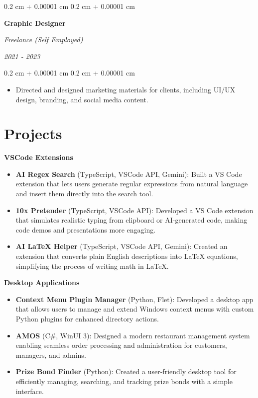 \documentclass[10pt, a4paper]{article}
\newenvironment{highlights}{
    \begin{itemize}[
        topsep=0.1 cm,
        parsep=0.1 cm,
        partopsep=0pt,
        itemsep=0pt,
        leftmargin=0.4 cm + 10pt
    ]
}{
    \end{itemize}
} %
\newenvironment{onecolentry}{
    \begin{adjustwidth}{
        0.2 cm + 0.00001 cm
    }{
        0.2 cm + 0.00001 cm
    }
}{
    \end{adjustwidth}
} %
\newenvironment{twocolentry}[2][]{
    \onecolentry
    \def\secondColumn{#2}
    \begin{paracol}{2}
}{
    \switchcolumn \raggedleft \secondColumn
    \end{paracol}
    \endonecolentry
} %
\newcommand{\createpointblock}[5]{%
    \begin{twocolentry}{%
        \textit{#2}

        \textit{#4}}
        \textbf{#1}

        \textit{#3}
    \end{twocolentry}

    \vspace{0.1 cm}
    \begin{onecolentry}
        \begin{highlights}
            #5
        \end{highlights}
    \end{onecolentry}
}
\let\hrefWithoutArrow\href
\renewcommand{\href}[2]{\hrefWithoutArrow{#1}{\ifthenelse{\equal{#2}{}}{ }{#2 }\raisebox{.15ex}{\footnotesize \faExternalLink*}}}
\begin{document}
    \vspace{0.2 cm}
    
    \createpointblock{Graphic Designer}{2021 - 2023}{Freelance (Self Employed)}{}
    {%
        \item Directed and designed marketing materials for clients, including UI/UX design, branding, and social media content.
    }
    
\section{Projects}

\textbf{VSCode Extensions}
\begin{highlights}
    \item \textbf{AI Regex Search} (TypeScript, VSCode API, Gemini): Built a VS Code extension that lets users generate regular expressions from natural language and insert them directly into the search tool. \href{https://github.com/abdxdev/ai-regex-search}{}
    \item \textbf{10x Pretender} (TypeScript, VSCode API): Developed a VS Code extension that simulates realistic typing from clipboard or AI-generated code, making code demos and presentations more engaging. \href{https://github.com/abdxdev/10x-Pretender}{}
    \item \textbf{AI LaTeX Helper} (TypeScript, VSCode API, Gemini): Created an extension that converts plain English descriptions into LaTeX equations, simplifying the process of writing math in LaTeX. \href{https://github.com/abdxdev/AI-LaTeX-Helper}{}
\end{highlights}

\vspace{0.2 cm}

\textbf{Desktop Applications}
\begin{highlights}
    \item \textbf{Context Menu Plugin Manager} (Python, Flet): Developed a desktop app that allows users to manage and extend Windows context menus with custom Python plugins for enhanced directory actions. \href{https://github.com/abdxdev/Context-Menu-Plugin-Manager}{}
    \item \textbf{AMOS} (C\#, WinUI 3): Designed a modern restaurant management system enabling seamless order processing and administration for customers, managers, and admins. \href{https://github.com/abdxdev/AMOS}{}
    \item \textbf{Prize Bond Finder} (Python): Created a user-friendly desktop tool for efficiently managing, searching, and tracking prize bonds with a simple interface. \href{https://github.com/abdxdev/prize-bond-finder}{}
\end{highlights}
\end{document}
